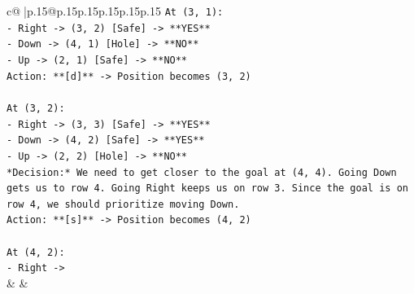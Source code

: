 \documentclass{article}
\begin{document}
{\begin{supertabular}{c@{$\;$}|p{.15\linewidth}@{}p{.15\linewidth}p{.15\linewidth}p{.15\linewidth}p{.15\linewidth}p{.15\linewidth}}
{{{\texttt{At (3, 1):} \\
\texttt{{-} Right {-}> (3, 2) {[}Safe{]} {-}> **YES**} \\
\texttt{{-} Down {-}> (4, 1) {[}Hole{]} {-}> **NO**} \\
\texttt{{-} Up {-}> (2, 1) {[}Safe{]} {-}> **NO**} \\
\texttt{Action: **{[}d{]}** {-}> Position becomes (3, 2)} \\
\\ 
\texttt{At (3, 2):} \\
\texttt{{-} Right {-}> (3, 3) {[}Safe{]} {-}> **YES**} \\
\texttt{{-} Down {-}> (4, 2) {[}Safe{]} {-}> **YES**} \\
\texttt{{-} Up {-}> (2, 2) {[}Hole{]} {-}> **NO**} \\
\texttt{*Decision:* We need to get closer to the goal at (4, 4). Going Down gets us to row 4. Going Right keeps us on row 3. Since the goal is on row 4, we should prioritize moving Down.} \\
\texttt{Action: **{[}s{]}** {-}> Position becomes (4, 2)} \\
\\ 
\texttt{At (4, 2):} \\
\texttt{{-} Right {-}>} \\
            }
        }
    }
    & & \\ \\


\end{supertabular}}
\end{document}
